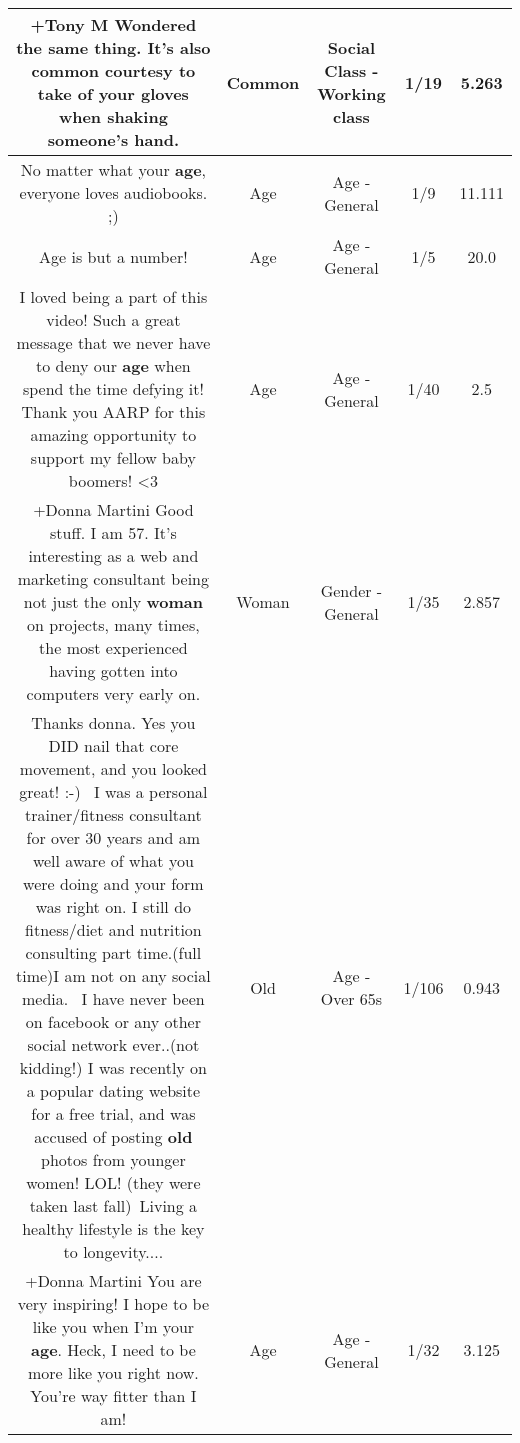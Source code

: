 \documentclass[11pt]{article}
\newlength\mylength
\begin{document}
\begin{center}
\begin{longtable}{|C{.65\mylength}|C{.30\mylength}|C{.12\mylength}|C{.12\mylength}|C{.12\mylength}|}
  \small +Tony M Wondered the same thing. It's also \textbf{common} courtesy to take of your gloves when shaking someone's hand.\normalsize   & Common & Social Class - Working class & 1/19 & 5.263 \\  \hline
  \small No matter what your \textbf{age}, everyone loves audiobooks. ;)\normalsize   & Age & Age - General & 1/9 & 11.111 \\  \hline
  \small Age is but a number!\normalsize   & Age & Age - General & 1/5 & 20.0 \\  \hline
  \small I loved being a part of this video! Such a great message that we never have to deny our \textbf{age} when spend the time defying it! Thank you AARP for this amazing opportunity to support my fellow baby boomers! <3\normalsize   & Age & Age - General & 1/40 & 2.5 \\  \hline
  \small +Donna Martini Good stuff.  I am 57.  It's interesting as a web and marketing consultant being not just the only \textbf{woman} on projects, many times, the most experienced having gotten into computers very early on.\normalsize   & Woman & Gender - General & 1/35 & 2.857 \\  \hline
  \small Thanks donna. Yes you DID nail that core movement, and you looked great! :-)  I was a personal trainer/fitness consultant for over 30 years and am well aware of what you were doing and your form was right on. I still do fitness/diet and nutrition consulting part time.(full time)I am not on any social media.  I have never been on facebook or any other social network ever..(not kidding!) I was recently on a popular dating website for a free trial, and was accused of posting \textbf{old} photos from younger women! LOL! (they were taken last fall) Living a healthy lifestyle is the key to longevity....\normalsize   & Old & Age - Over 65s & 1/106 & 0.943 \\  \hline
  \small +Donna Martini You are very inspiring! I hope to be like you when I'm your \textbf{age}. Heck, I need to be more like you right now. You're way fitter than I am!\normalsize   & Age & Age - General & 1/32 & 3.125 \\  \hline

\end{longtable}
\end{center}
\end{document}
